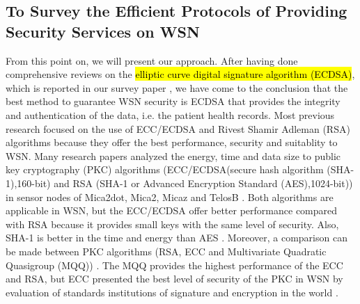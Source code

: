 \documentclass[a4paper,11pt]{article}
\DeclareRobustCommand{\hlyellow}[1]{{\sethlcolor{white}\hl{#1}}}
\begin{document}
\subsection{To Survey the Efficient Protocols of Providing Security Services on WSN}
From this point on, we will present our approach. After having done comprehensive reviews on the \hlyellow{elliptic curve digital signature algorithm (ECDSA)}, which is reported in our survey paper \cite{p93}, we have come to the conclusion that the best method to guarantee WSN security is ECDSA that provides the integrity and authentication of the data, i.e. the patient health records. Most previous research focused on the use of ECC/ECDSA and Rivest Shamir Adleman (RSA) algorithms because they offer the best performance, security and suitablity to WSN. Many research papers analyzed the energy, time and data size to public key cryptography (PKC) algorithms (ECC/ECDSA(secure hash algorithm (SHA-1),160-bit) and RSA (SHA-1 or Advanced Encryption Standard (AES),1024-bit)) in sensor nodes of Mica2dot, Mica2, Micaz and TelosB \cite{p47,p36,p9,p45,p32}. Both algorithms are applicable in WSN, but the ECC/ECDSA offer better performance compared with RSA because it provides small keys with the same level of security. Also, SHA-1 is better in the time and energy than AES \cite{p9}. Moreover, a comparison can be made between PKC algorithms (RSA, ECC and Multivariate Quadratic Quasigroup (MQQ)) \cite{pr36}. The MQQ provides the highest performance of the ECC and RSA, but ECC presented the best level of security of the PKC in WSN by evaluation of standards institutions of signature and encryption in the world \hlyellow{\cite{pr60,pr59,pr36,pr57,pr58}}.
\end{document}
